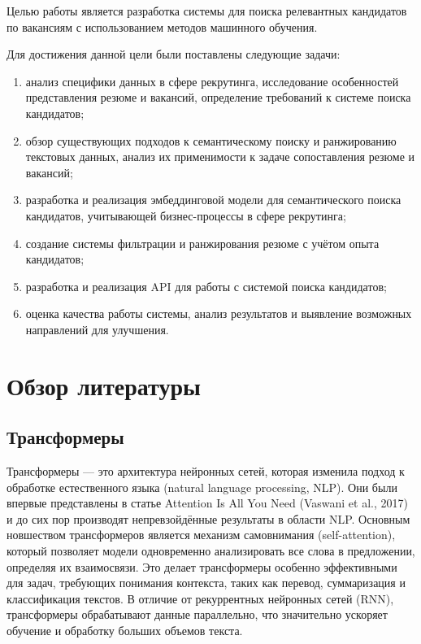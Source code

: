 \documentclass[14pt]{mmcs_article}
\begin{document}
Целью работы является разработка системы для поиска релевантных кандидатов по вакансиям с использованием методов машинного обучения.

Для достижения данной цели были поставлены следующие задачи:
\begin{enumerate}
  \item анализ специфики данных в сфере рекрутинга, исследование особенностей представления резюме и вакансий, определение требований к системе поиска кандидатов;
  \item обзор существующих подходов к семантическому поиску и ранжированию текстовых данных, анализ их применимости к задаче сопоставления резюме и вакансий;
  \item разработка и реализация эмбеддинговой модели для семантического поиска кандидатов, учитывающей бизнес-процессы в сфере рекрутинга;
  \item создание системы фильтрации и ранжирования резюме с учётом опыта кандидатов;
  \item разработка и реализация API для работы с системой поиска кандидатов;
  \item оценка качества работы системы, анализ результатов и выявление возможных направлений для улучшения.
\end{enumerate}


\newpage
\section*{Обзор литературы}\label{literature_review}

\subsection*{Трансформеры}\label{transformers}

Трансформеры — это архитектура нейронных сетей, которая изменила подход к обработке естественного языка (natural language processing, NLP). Они были впервые представлены в статье Attention Is All You Need (Vaswani et al., 2017) \cite{vaswani2023attentionneed} и до сих пор производят непревзойдённые результаты в области NLP. Основным новшеством трансформеров является механизм самовнимания (self-attention), который позволяет модели одновременно анализировать все слова в предложении, определяя их взаимосвязи. Это делает трансформеры особенно эффективными для задач, требующих понимания контекста, таких как перевод, суммаризация и классификация текстов. В отличие от рекуррентных нейронных сетей (RNN), трансформеры обрабатывают данные параллельно, что значительно ускоряет обучение и обработку больших объемов текста.
\end{document}
